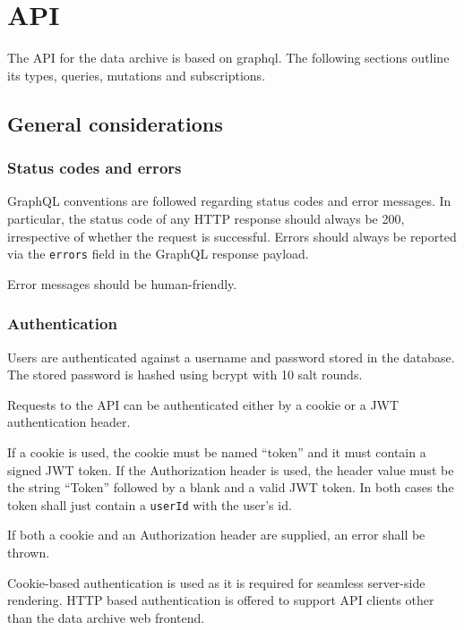 \section{API}

The API for the data archive is based on \Gls{graphql}. The following sections outline its types, queries, mutations and subscriptions.

\subsection{General considerations}

\subsubsection{Status codes and errors}

GraphQL conventions are followed regarding status codes and error messages. In particular, the status code of any HTTP response should always be 200, irrespective of whether the request is successful. Errors should always be reported via the \verb|errors| field in the GraphQL response payload.

Error messages should be human-friendly.

\subsubsection{Authentication}
\label{sec:authentication}

Users are authenticated against a username and password stored in the database. The stored password is hashed using \gls{bcrypt} with 10 salt rounds.

Requests to the API can be authenticated either by a cookie or a JWT authentication header.

If a cookie is used, the cookie must be named ``token'' and it  must contain a signed JWT token. If the Authorization header is used, the header value must be the string ``Token'' followed by a blank and a valid JWT token. In both cases the token shall just contain a \verb|userId| with the user's id.

If both a cookie and an Authorization header are supplied, an error shall be thrown.

\begin{note}
Cookie-based authentication is used as it is required for seamless server-side rendering. HTTP based authentication is offered to support API clients other than the data archive web frontend.
\end{note}

